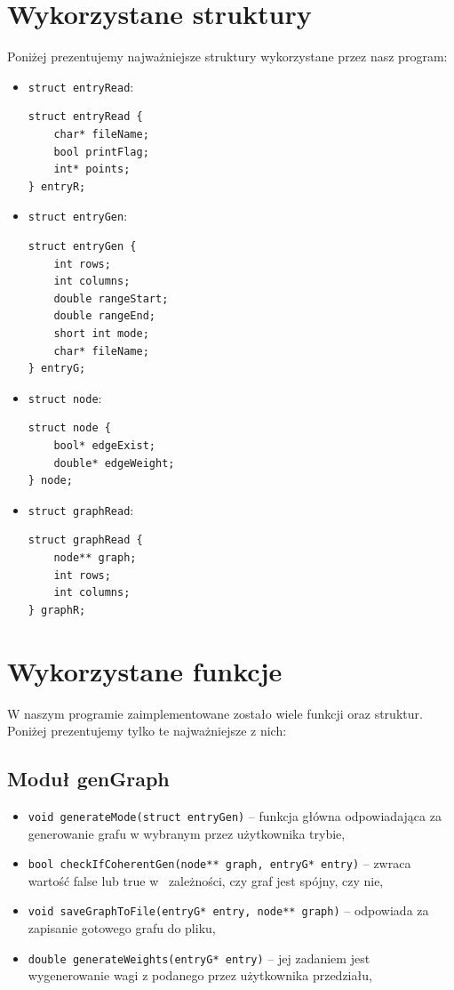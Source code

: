 \documentclass[10pt, a4paper]{report}
\begin{document}
    \section{Wykorzystane struktury}
    Poniżej prezentujemy najważniejsze struktury wykorzystane przez nasz program:
    \begin{itemize}
        \item \texttt{struct entryRead}:
        \begin{lstlisting}
struct entryRead {
    char* fileName;
    bool printFlag;
    int* points;
} entryR;
        \end{lstlisting}
        \item \texttt{struct entryGen}:
        \begin{lstlisting}
struct entryGen {
    int rows;
    int columns;
    double rangeStart;
    double rangeEnd;
    short int mode;
    char* fileName;
} entryG;
        \end{lstlisting}
        \newpage
        \item \texttt{struct node}:
        \begin{lstlisting}
struct node {
    bool* edgeExist;
    double* edgeWeight;
} node;
        \end{lstlisting}
        \item \texttt{struct graphRead}:
        \begin{lstlisting}
struct graphRead {
    node** graph;
    int rows;
    int columns;
} graphR;
        \end{lstlisting}
    \end{itemize}

    \section{Wykorzystane funkcje}
    W naszym programie zaimplementowane zostało wiele funkcji oraz struktur. Poniżej prezentujemy tylko te najważniejsze z nich:
    \subsection{Moduł genGraph}
    \begin{itemize}
        \item \texttt{void generateMode(struct entryGen)} -- funkcja główna odpowiadająca za generowanie grafu w wybranym przez użytkownika trybie,
        \item \texttt{bool checkIfCoherentGen(node** graph, entryG* entry)} -- zwraca wartość false lub true w~ zależności, czy graf jest spójny, czy nie,
        \item \texttt{void saveGraphToFile(entryG* entry, node** graph)} -- odpowiada za zapisanie gotowego grafu do pliku,
        \item \texttt{double generateWeights(entryG* entry)} -- jej zadaniem jest wygenerowanie wagi z podanego przez użytkownika przedziału,
    \end{itemize}
\end{document}
